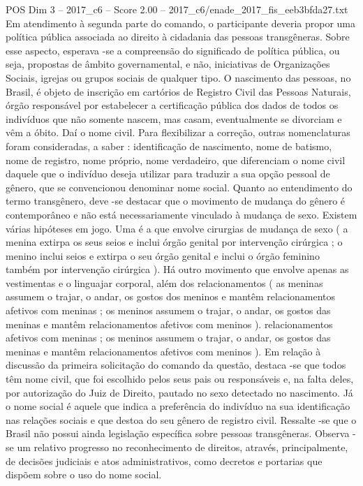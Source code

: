 \begin{textsample}{POS Dim 3 – 2017\_c6 – Score 2.00 – 2017\_c6/enade\_2017\_fis\_eeb3bfda27.txt}
Em atendimento à segunda parte do comando, o participante deveria propor uma política pública associada ao direito à cidadania das pessoas transgêneras.
Sobre esse aspecto, esperava -se a compreensão do significado de política pública, ou seja, propostas de âmbito governamental, e não, iniciativas de Organizações Sociais, igrejas ou grupos sociais de qualquer tipo.
O nascimento das pessoas, no Brasil, é objeto de inscrição em cartórios de Registro Civil das Pessoas Naturais, órgão responsável por estabelecer a certificação pública dos dados de todos os indivíduos que não somente nascem, mas casam, eventualmente se divorciam e vêm a óbito.
Daí o nome civil.
Para flexibilizar a correção, outras nomenclaturas foram consideradas, a saber : identificação de nascimento, nome de batismo, nome de registro, nome próprio, nome verdadeiro, que diferenciam o nome civil daquele que o indivíduo deseja utilizar para traduzir a sua opção pessoal de gênero, que se convencionou denominar nome social.
Quanto ao entendimento do termo transgênero, deve -se destacar que o movimento de mudança do gênero é contemporâneo e não está necessariamente vinculado à mudança de sexo.
Existem várias hipóteses em jogo.
Uma é a que envolve cirurgias de mudança de sexo ( a menina extirpa os seus seios e inclui órgão genital por intervenção cirúrgica ; o menino inclui seios e extirpa o seu órgão genital e inclui o órgão feminino também por intervenção cirúrgica ).
Há outro movimento que envolve apenas as vestimentas e o linguajar corporal, além dos relacionamentos ( as meninas assumem o trajar, o andar, os gostos dos meninos e mantêm relacionamentos afetivos com meninas ; os meninos assumem o trajar, o andar, os gostos das meninas e mantêm relacionamentos afetivos com meninos ). relacionamentos afetivos com meninas ; os meninos assumem o trajar, o andar, os gostos das meninas e mantêm relacionamentos afetivos com meninos ).
Em relação à discussão da primeira solicitação do comando da questão, destaca -se que todos têm nome civil, que foi escolhido pelos seus pais ou responsáveis e, na falta deles, por autorização do Juiz de Direito, pautado no sexo detectado no nascimento.
Já o nome social é aquele que indica a preferência do indivíduo na sua identificação nas relações sociais e que destoa do seu gênero de registro civil.
Ressalte -se que o Brasil não possui ainda legislação específica sobre pessoas transgêneras.
Observa -se um relativo progresso no reconhecimento de direitos, através, principalmente, de decisões judiciais e atos administrativos, como decretos e portarias que dispõem sobre o uso do nome social.

\end{textsample}

